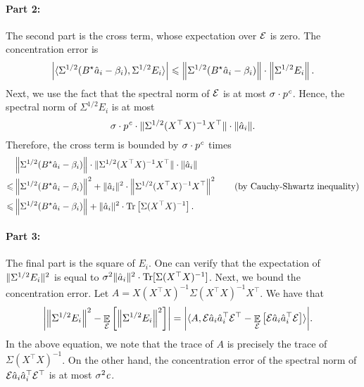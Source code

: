 	\paragraph{Part 2:} The second part is the cross term, whose expectation over $\mathcal{E}$ is zero. The concentration error is
	\begin{align*}
		{\left| {\langle \Sigma^{1/2}(B^{\star} \hat{a}_i - \beta_i), \Sigma^{1/2}E_i \rangle} \right|}
		\leqslant \left\| \Sigma^{1/2} (B^{\star} \hat{a}_i - \beta_i) \right\| \cdot \left\| \Sigma^{1/2} E_i \right\|.
	\end{align*}
	Next, we use the fact that the spectral norm of $\mathcal{E}$ is at most $\sigma \cdot p^{{\mathit{c}}}$.
	Hence, the spectral norm of $\Sigma^{1/2} E_i$ is at most
		\[ \sigma \cdot p^{{\mathit{c}}} \cdot \|\Sigma^{1/2} (X^{\top} X)^{-1} X^{\top}\| \cdot \|\hat{a}_i\|. \]
	Therefore, the cross term is bounded by $\sigma \cdot p^{{\mathit{c}}}$ times
	\begin{align*}
			& \left\| \Sigma^{1/2} (B^{\star} \hat{a}_i - \beta_i) \right\| \cdot \|\Sigma^{1/2} (X^{\top} X)^{-1} X^{\top}\| \cdot \|\hat{a}_i\| \\
		\leqslant & \left\| \Sigma^{1/2} (B^{\star} \hat{a}_i - \beta_i) \right\|^2 + \|\hat{a}_i\|^2 \cdot \left\| \Sigma^{1/2} (X^{\top} X)^{-1} X^{\top} \right\|^2 \tag{by Cauchy-Shwartz inequality} \\
		\leqslant & \left\| \Sigma^{1/2}(B^{\star} \hat{a}_i - \beta_i) \right\| + \|\hat{a}_i\|^2 \cdot \operatorname{Tr}\left[\Sigma (X^{\top} X)^{-1}\right].
	\end{align*}

	\paragraph{Part 3:} The final part is the square of $E_i$. One can verify that the expectation of $\|\Sigma^{1/2} E_i\|^2$ is equal to $\sigma^2 \|\hat{a}_i\|^2 \cdot \operatorname{Tr}[\Sigma (X^{\top} X)^{-1}]$.
	Next, we bound the concentration error.
	Let $A = X (X^{\top} X)^{-1} \Sigma (X^{\top} X)^{-1} X^{\top}$.
	We have that
	\begin{align*}
		{\left| {\left\| \Sigma^{1/2} E_i \right\|^2 - \mathop{\mathbb{E}}_{\mathcal{E}}\left[ \left\| \Sigma^{1/2} E_i \right\|^2 \right]} \right|}
		&= {\left| {\langle A, \mathcal{E} \hat{a}_i \hat{a}_i^{\top} \mathcal{E}^{\top} - \mathop{\mathbb{E}}_{\mathcal{E}}\left[ \mathcal{E} \hat{a}_i \hat{a}_i^{\top} \mathcal{E} \right] \rangle} \right|}.
	\end{align*}
	In the above equation, we note that the trace of $A$ is precisely the trace of $\Sigma (X^{\top} X)^{-1}$.
	On the other hand, the concentration error of the spectral norm of $\mathcal{E} \hat{a}_i \hat{a}_i^{\top} \mathcal{E}^{\top}$ is at most $\sigma^2 {\mathit{c}} $.

